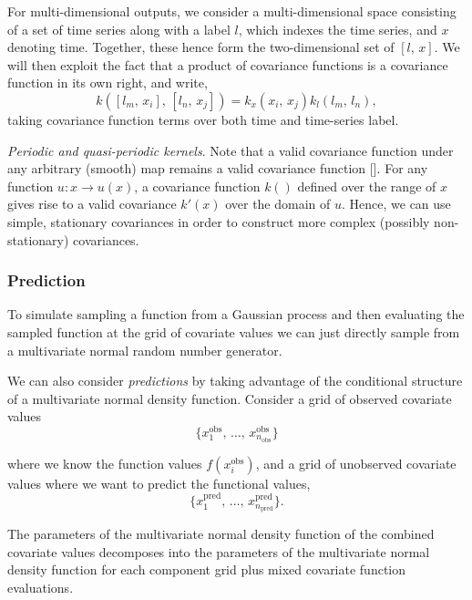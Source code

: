          For multi-dimensional outputs, we consider a multi-dimensional space consisting of a set of time series along with a label \(l\), which indexes the time series, and \(x\) denoting time. Together, these hence form the two-dimensional set of \([l, \, x]\). We will then exploit the fact that a product of covariance functions is a covariance function in its own right, and write, \[k([l_{m}, \, x_{i}], \, [l_{n}, \, x_{j}]) = k_{x} (x_{i}, \, x_{j}) k_{l} (l_{m}, \, l_{n}),\] taking covariance function terms over both time and time-series label.

         \vspace{1em}

         \textit{Periodic and quasi-periodic kernels}. Note that a valid covariance function under any arbitrary (smooth) map remains a valid covariance function []. For any function \(u: x \to u(x)\), a covariance function \(k()\) defined over the range of \(x\) gives rise to a valid covariance \(k'(x)\) over the domain of \(u\). Hence, we can use simple, stationary covariances in order to construct more complex (possibly non-stationary) covariances. 

      \subsubsection{Prediction}

         \cite{Betancourt2020} To simulate sampling a function from a Gaussian process and then evaluating the sampled function at the grid of covariate values we can just directly sample from a multivariate normal random number generator.

         \vspace{1em}

         We can also consider \textit{predictions} by taking advantage of the conditional structure of a multivariate normal density function. Consider a grid of observed covariate values \[\{x_{1}^{\text{obs}}, \, \ldots, \, x_{n_{\text{obs}}}^{\text{obs}}\}\]

         where we know the function values \(f(x_{i}^{\text{obs}})\), and a grid of unobserved covariate values where we want to predict the functional values, \[\{x_{1}^{\text{pred}}, \, \ldots, \, x_{n_{\text{pred}}}^{\text{pred}}\}.\]

         The parameters of the multivariate normal density function of the combined covariate values decomposes into the parameters of the multivariate normal density function for each component grid plus mixed covariate function evaluations.

